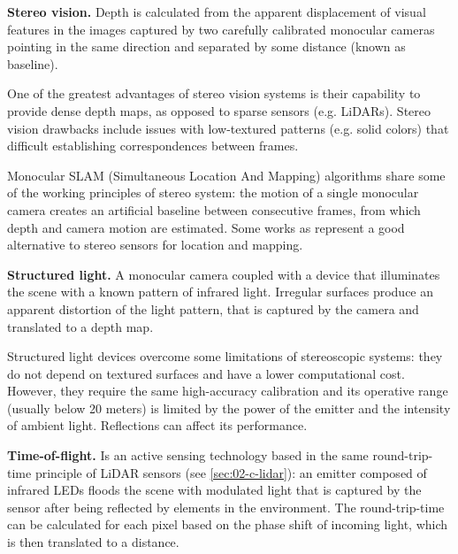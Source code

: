 \textbf{Stereo vision.} Depth is calculated \cite{Hamzah2016} from the 
apparent displacement of visual features in the images captured by two 
carefully calibrated monocular cameras pointing in the same direction and
separated by some distance (known as baseline). 
            
One of the greatest advantages of stereo vision systems is their capability 
to provide dense depth maps, as opposed to sparse sensors (e.g. LiDARs).  
Stereo vision drawbacks include issues with low-textured patterns 
(e.g. solid colors) that difficult establishing correspondences between
frames.

Monocular SLAM (Simultaneous Location And Mapping) algorithms share some of the
working principles of stereo system: the motion of a single monocular camera 
creates an artificial baseline between consecutive frames, from which depth and
camera motion are estimated.
Some works as \cite{Engel2014, Engel2018} represent a good alternative to
stereo sensors for location and mapping. 
    
\textbf{Structured light.} A monocular camera coupled with a device that
illuminates the scene with a known pattern of infrared light. 
Irregular surfaces produce an apparent distortion of the light pattern, that is
captured by the camera and translated to a depth map.

Structured light devices overcome some limitations of stereoscopic systems:
they do not depend on textured surfaces and have a lower computational cost. 
However, they require the same high-accuracy calibration \cite{Garbat2013}
and its operative range (usually below 20 meters) is limited by the power of
the emitter and the intensity of ambient light. Reflections can affect its
performance.


\textbf{Time-of-flight.} Is an active sensing technology 
\cite{Hansard2013} based in the same round-trip-time principle 
of LiDAR sensors (see \ref{sec:02-c-lidar}): an emitter composed of infrared 
LEDs floods the scene with modulated light that is captured by the sensor after
being reflected by elements in the environment. 
The round-trip-time can be calculated for each pixel based on the phase shift 
of incoming light, which is then translated to a distance.

